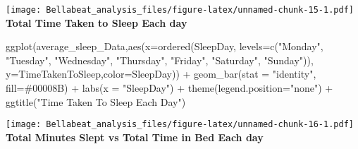 \documentclass[
]{article}
\newenvironment{Shaded}{\begin{snugshade}}{\end{snugshade}}
\newcommand{\AttributeTok}[1]{\textcolor[rgb]{0.77,0.63,0.00}{#1}}
\newcommand{\FunctionTok}[1]{\textcolor[rgb]{0.00,0.00,0.00}{#1}}
\newcommand{\NormalTok}[1]{#1}
\newcommand{\SpecialCharTok}[1]{\textcolor[rgb]{0.00,0.00,0.00}{#1}}
\newcommand{\StringTok}[1]{\textcolor[rgb]{0.31,0.60,0.02}{#1}}
\begin{document}
\texttt{[image: Bellabeat\_analysis\_files/figure-latex/unnamed-chunk-15-1.pdf]}\\
\textbf{Total Time Taken to Sleep Each day}

\begin{Shaded}
\begin{Highlighting}[]
\FunctionTok{ggplot}\NormalTok{(average\_sleep\_Data,}\FunctionTok{aes}\NormalTok{(}\AttributeTok{x=}\FunctionTok{ordered}\NormalTok{(SleepDay, }
                                        \AttributeTok{levels=}\FunctionTok{c}\NormalTok{(}\StringTok{"Monday"}\NormalTok{, }\StringTok{"Tuesday"}\NormalTok{, }\StringTok{"Wednesday"}\NormalTok{, }\StringTok{"Thursday"}\NormalTok{,}
                                                 \StringTok{"Friday"}\NormalTok{, }\StringTok{"Saturday"}\NormalTok{, }\StringTok{"Sunday"}\NormalTok{)), }
                              \AttributeTok{y=}\NormalTok{TimeTakenToSleep,}\AttributeTok{color=}\NormalTok{SleepDay)) }\SpecialCharTok{+} 
  \FunctionTok{geom\_bar}\NormalTok{(}\AttributeTok{stat =} \StringTok{"identity"}\NormalTok{, }\AttributeTok{fill=}\StringTok{\textquotesingle{}\#00008B\textquotesingle{}}\NormalTok{) }\SpecialCharTok{+} \FunctionTok{labs}\NormalTok{(}\AttributeTok{x =} \StringTok{"SleepDay"}\NormalTok{) }\SpecialCharTok{+}
  \FunctionTok{theme}\NormalTok{(}\AttributeTok{legend.position=}\StringTok{"none"}\NormalTok{) }\SpecialCharTok{+}
  \FunctionTok{ggtitle}\NormalTok{(}\StringTok{"Time Taken To Sleep Each Day"}\NormalTok{)}
\end{Highlighting}
\end{Shaded}

\texttt{[image: Bellabeat\_analysis\_files/figure-latex/unnamed-chunk-16-1.pdf]}\\
\textbf{Total Minutes Slept vs Total Time in Bed Each day}
\end{document}
